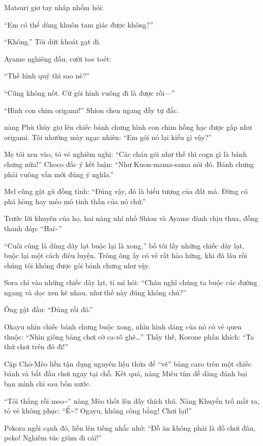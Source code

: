 \documentclass[../main.tex]{subfiles}
\begin{document}
Matsuri giơ tay nhấp nhổm hỏi:

``Em có thể dùng khuôn tam giác được không?''

``Không.'' Tôi dứt khoát gạt đi.

Ayame nghiêng đầu, cười toe toét:

``Thế hình quỷ thì sao nè?''

``Cũng không nốt. Cứ gói hình vuông đi là được rồi---''

``Hình con chim origami!'' Shion chen ngang đầy tự đắc.

nàng Phù thủy giơ lên chiếc bánh chưng hình con chim hồng hạc được gấp như origami. Tôi nhướng mày ngạc nhiên: ``Em gói nó lại kiểu gì vậy?''

Mẹ tôi xen vào, tỏ vẻ nghiêm nghị: ``Các cháu gói như thế thì cogn gì là bánh chưng nữa!'' Choco đắc ý kết luận: ``Như Kuon-mama-sama nói đó. Bánh chưng phải vuông vắn mới đúng ý nghĩa.''

Mel cũng gật gù đồng tình: ``Đúng vậy, đó là biểu tượng của đất mà. Đừng có phá hỏng hay méo mó tinh thần của nó chứ.''

Trước lời khuyên của họ, hai nàng nhí nhố Shion và Ayame đành chịu thua, đồng thanh đáp: ``Hai\~{}''

\ct

``Cuối cùng là dùng dây lạt buộc lại là xong,'' bố tôi lấy những chiếc dây lạt, buộc lại một cách điêu luyện. Trông ông ấy có vẻ rất hào hứng, khi đã lâu rồi chúng tôi không được gói bánh chưng như vậy.

Sora chỉ vào những chiếc dây lạt, tỉ mỉ hỏi: ``Cháu nghĩ chúng ta buộc các đường ngang và dọc xen kẽ nhau, như thế này đúng không chú?''

Ông gật đầu: ``Đúng rồi đó.''

Okayu nhìn chiếc bánh chưng buộc xong, nhìn hình dáng của nó có vẻ quen thuộc: ``Nhìn giống bảng chơi cờ ca-rô ghê\dots'' Thấy thế, Korone phấn khích: ``Ta thử chơi trên đó đi!''

Cặp Chó-Mèo liền tận dụng nguyên liệu thừa để ``vẽ'' bảng caro trên một chiếc bánh và bắt đầu chơi ngay tại chỗ. Kết quả, nàng Miêu tím dễ dàng đánh bại bạn mình chỉ sau bốn nước.

``Tôi thắng rồi meo\~{}'' nàng Mèo thốt lên đầy thích thú. Nàng Khuyển trố mắt ra, tỏ vẻ không phục: ``Ể\~{}? Ogayu, không công bằng! Chơi lại!''

Pekora ngồi cạnh đó, liền lên tiếng nhắc nhở: ``Đồ ăn không phải là đồ chơi đâu, peko! Nghiêm túc giùm đi cái!''
\end{document}
